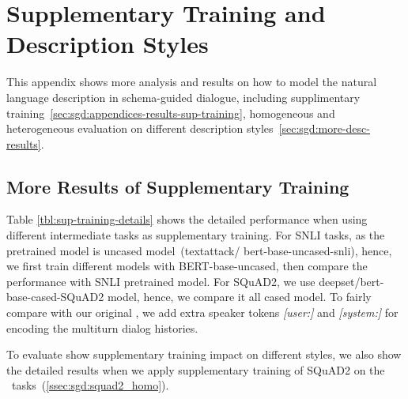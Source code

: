 \chapter{Supplementary Training and Description Styles}
\label{chap:appendix:schema-analysis}
This appendix shows more analysis and results on how to model the
natural language description in schema-guided dialogue, including
supplimentary
training~\autoref{sec:sgd:appendices-results-sup-training},
homogeneous and heterogeneous evaluation on different description
styles~\autoref{sec:sgd:more-desc-results}.

\section{More Results of Supplementary Training}
\label{sec:sgd:appendices-results-sup-training}
Table \ref{tbl:sup-training-details} shows the detailed performance
when using different intermediate tasks as supplementary training.  For
SNLI tasks, as the pretrained model is uncased model~(textattack/
bert-base-uncased-snli), hence, we first train different models with
BERT-base-uncased, then compare the performance with SNLI pretrained
model. For SQuAD2, we use deepset/bert-base-cased-SQuAD2 model, hence,
we compare it all cased model. To fairly compare with our original
\CE, we add extra speaker tokens \emph{[user:]} and \emph{[system:]} for encoding
the multiturn dialog histories.

To evaluate show supplementary training impact on different styles, we
also show the detailed results when we apply supplementary training of
SQuAD2 on the \NSL~tasks~(\autoref{ssec:sgd:squad2_homo}).

